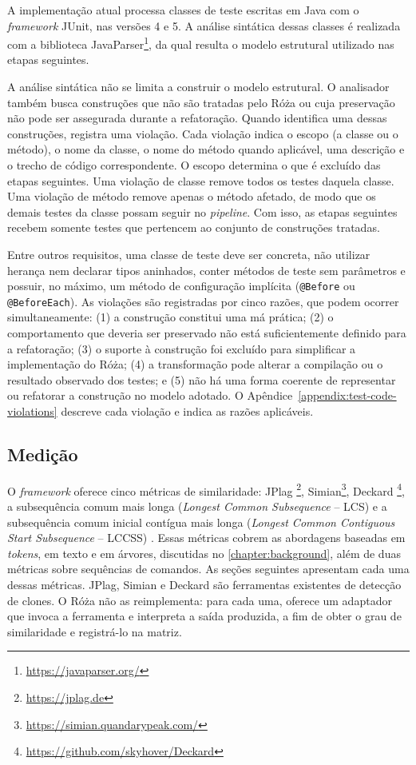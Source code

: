 A implementação atual processa classes de teste escritas em Java com o \textit{framework} JUnit, nas versões 4 e 5. A análise sintática dessas classes é realizada com a biblioteca JavaParser\footnote{\url{https://javaparser.org/}}, da qual resulta o modelo estrutural utilizado nas etapas seguintes.

A análise sintática não se limita a construir o modelo estrutural. O analisador também busca construções que não são tratadas pelo Róża ou cuja preservação não pode ser assegurada durante a refatoração. Quando identifica uma dessas construções, registra uma violação. Cada violação indica o escopo (a classe ou o método), o nome da classe, o nome do método quando aplicável, uma descrição e o trecho de código correspondente. O escopo determina o que é excluído das etapas seguintes. Uma violação de classe remove todos os testes daquela classe. Uma violação de método remove apenas o método afetado, de modo que os demais testes da classe possam seguir no \textit{pipeline}. Com isso, as etapas seguintes recebem somente testes que pertencem ao conjunto de construções tratadas.

Entre outros requisitos, uma classe de teste deve ser concreta, não utilizar herança nem declarar tipos aninhados, conter métodos de teste sem parâmetros e possuir, no máximo, um método de configuração implícita (\texttt{@Before} ou \texttt{@BeforeEach}). As violações são registradas por cinco razões, que podem ocorrer simultaneamente: (1) a construção constitui uma má prática; (2) o comportamento que deveria ser preservado não está suficientemente definido para a refatoração; (3) o suporte à construção foi excluído para simplificar a implementação do Róża; (4) a transformação pode alterar a compilação ou o resultado observado dos testes; e (5) não há uma forma coerente de representar ou refatorar a construção no modelo adotado. O Apêndice~\ref{appendix:test-code-violations} descreve cada violação e indica as razões aplicáveis.

\subsection{Medição}

O \textit{framework} oferece cinco métricas de similaridade: JPlag \cite{prechelt:etal:2002}\footnote{\url{https://jplag.de}}, Simian\footnote{\url{https://simian.quandarypeak.com/}}, Deckard \cite{jiang:etal:2007}\footnote{\url{https://github.com/skyhover/Deckard}}, a subsequência comum mais longa (\textit{Longest Common Subsequence} -- LCS) \cite{hirschberg:1977} e a subsequência comum inicial contígua mais longa (\textit{Longest Common Contiguous Start Subsequence} -- LCCSS) \cite{silva:etal:2020}. Essas métricas cobrem as abordagens baseadas em \textit{tokens}, em texto e em árvores, discutidas no \autoref{chapter:background}, além de duas métricas sobre sequências de comandos. As seções seguintes apresentam cada uma dessas métricas. JPlag, Simian e Deckard são ferramentas existentes de detecção de clones. O Róża não as reimplementa: para cada uma, oferece um adaptador que invoca a ferramenta e interpreta a saída produzida, a fim de obter o grau de similaridade e registrá-lo na matriz.

